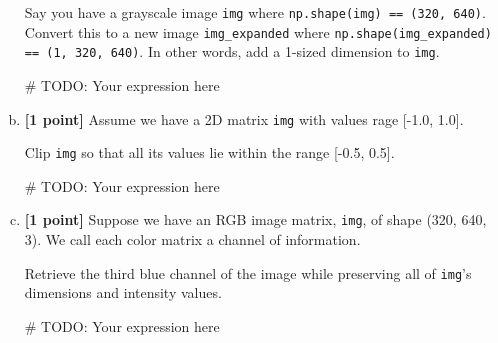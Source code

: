 \documentclass[11pt]{article}
\begin{document}
\begin{enumerate}[(a)]
    \begin{tcolorbox}[colback=orange!5!white,colframe=orange!75!black]
    Say you have a grayscale image \texttt{img} where \texttt{np.shape(img) == (320, 640)}. Convert this to a new image \texttt{img\_expanded} where \texttt{np.shape(img\_expanded) == (1, 320, 640)}. In other words, add a 1-sized dimension to \texttt{img}.
    \end{tcolorbox}

\begin{tcolorbox}[colback=white!5!white,colframe=green!75!black,height=2cm]
    \begin{python}
    # TODO: Your expression here
    \end{python}
    \end{tcolorbox}
    
    \item \textbf{[1 point]} Assume we have a 2D matrix \texttt{img} with values rage [-1.0, 1.0]. 
    \begin{tcolorbox}[colback=orange!5!white,colframe=orange!75!black]
    Clip \texttt{img} so that all its values lie within the range [-0.5, 0.5].
    \end{tcolorbox}

    \begin{tcolorbox}[colback=white!5!white,colframe=green!75!black,height=2cm]
    \begin{python}
    # TODO: Your expression here
    \end{python}
    \end{tcolorbox}
    
    \item \textbf{[1 point]} Suppose we have an RGB image matrix, \texttt{img}, of shape (320, 640, 3). We call each color matrix a channel of information.
    \begin{tcolorbox}[colback=orange!5!white,colframe=orange!75!black]
    Retrieve the third blue channel of the image while preserving all of \texttt{img}'s dimensions and intensity values.
    \end{tcolorbox}
    
    \begin{tcolorbox}[colback=white!5!white,colframe=green!75!black,height=2cm]
    \begin{python}
    # TODO: Your expression here
    \end{python}
    \end{tcolorbox}


\end{enumerate}
\end{document}
